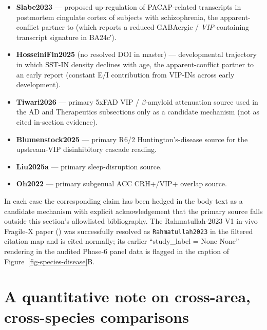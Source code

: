 \documentclass[11pt]{article}
\begin{document}
\begin{itemize}
\item \textbf{Slabe2023} \citep{Slabe2023}
--- proposed up-regulation of PACAP-related transcripts in postmortem
cingulate cortex of subjects with schizophrenia, the apparent-conflict
partner to \citet{Krolewski2025} (which reports a reduced GABAergic
/ \textit{VIP}-containing transcript signature in BA24c′).
\item \textbf{HosseiniFin2025} (no resolved DOI in master) --- developmental
trajectory in which SST-IN density declines with age, the
apparent-conflict partner to an early report (constant E/I
contribution from VIP-INs across early development).
\item \textbf{Tiwari2026} --- primary 5xFAD VIP / $\beta$-amyloid attenuation source
used in the AD and Therapeutics subsections only as a candidate
mechanism (not as cited in-section evidence).
\item \textbf{Blumenstock2025} --- primary R6/2 Huntington's-disease source for
the upstream-VIP disinhibitory cascade reading.
\item \textbf{Liu2025a} --- primary sleep-disruption source.
\item \textbf{Oh2022} --- primary subgenual ACC CRH+/VIP+ overlap source.
\end{itemize}

In each case the corresponding claim has been hedged in the body text
as a candidate mechanism with explicit acknowledgement that the
primary source falls outside this section's allowlisted bibliography. The
Rahmatullah-2023 V1 in-vivo Fragile-X paper
(\cite{Rahmatullah_2023})
was successfully resolved as \texttt{Rahmatullah2023} in the filtered citation
map and is cited normally; its earlier ``study\_label = None None''
rendering in the audited Phase-6 panel data is flagged in the caption
of Figure~\ref{fig-species-disease}B.

\section{A quantitative note on cross-area, cross-species comparisons}
\end{document}
